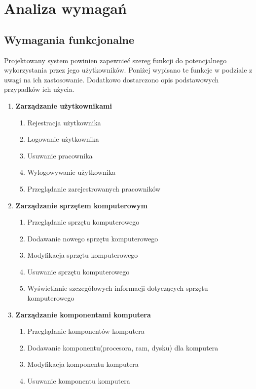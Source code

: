 \chapter{Analiza wymagań}

\section{Wymagania funkcjonalne}

Projektowany system powinien zapewnieć szereg funkcji do potencjalnego wykorzystania przez jego użytkowników. Poniżej wypisano te funkcje w podziale z uwagi na ich zastosowanie. Dodatkowo dostarczono opis podstawowych przypadków ich użycia.
\begin{enumerate}[label={\textbf{FR}-\bfseries\arabic*}]
    \item \textbf{Zarządzanie użytkownikami}
    \begin{enumerate}[label={FR-\arabic{enumi}.\arabic*},noparskip]
        \item Rejestracja użytkownika
        \item Logowanie użytkownika
        \item Usuwanie pracownika
        \item Wylogowywanie użytkownika
				\item Przeglądanie zarejestrowanych pracowników
    \end{enumerate}
		
		\item \textbf{Zarządzanie sprzętem komputerowym}
    \begin{enumerate}[label={FR-\arabic{enumi}.\arabic*},noparskip]
        \item Przeglądanie sprzętu komputerowego
        \item Dodawanie nowego sprzętu komputerowego
        \item Modyfikacja sprzętu komputerowego
        \item Usuwanie sprzętu komputerowego
				\item Wyświetlanie szczegółowych informacji dotyczących sprzętu komputerowego
		\end{enumerate}
		
		\item \textbf{Zarządzanie komponentami komputera}
			\begin{enumerate}[label={FR-\arabic{enumi}.\arabic*},noparskip]		
				\item Przeglądanie komponentów komputera
				\item Dodawanie komponentu(procesora, ram, dysku) dla komputera
				\item Modyfikacja komponentu komputera
				\item Usuwanie komponentu komputera
    \end{enumerate}
		

\end{enumerate}
